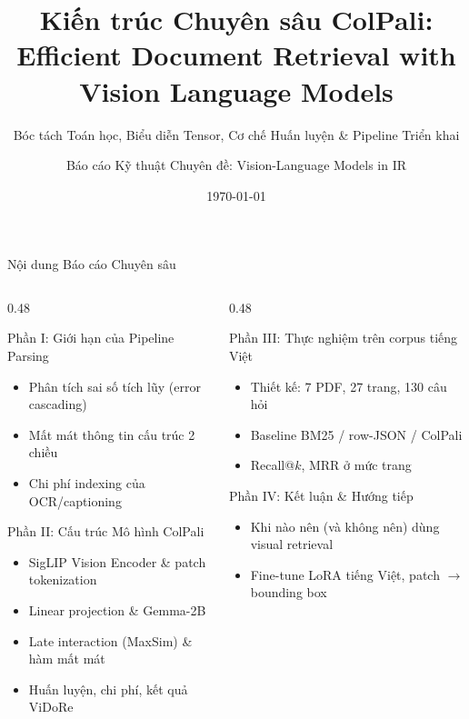 \documentclass[aspectratio=169,10pt]{beamer}
\title[Kiến trúc Chuyên sâu ColPali]{\textbf{Kiến trúc Chuyên sâu ColPali:\\ Efficient Document Retrieval with Vision Language Models}}
\subtitle{Bóc tách Toán học, Biểu diễn Tensor, Cơ chế Huấn luyện \& Pipeline Triển khai}
\author[Báo cáo Chuyên sâu AI]{Báo cáo Kỹ thuật Chuyên đề: Vision-Language Models in IR}
\institute[Advanced AI Lab]{Phòng Thí nghiệm Trí tuệ Nhân tạo \& Xử lý Ngôn ngữ Tự nhiên}
\date{\today}
\begin{document}
\begin{frame}
  \titlepage
\end{frame}

\begin{frame}{Nội dung Báo cáo Chuyên sâu}
  \begin{columns}[T]
    \begin{column}{0.48\textwidth}
      \begin{block}{Phần I: Giới hạn của Pipeline Parsing}
        \begin{itemize}
          \item Phân tích sai số tích lũy (error cascading)
          \item Mất mát thông tin cấu trúc 2 chiều
          \item Chi phí indexing của OCR/captioning
        \end{itemize}
      \end{block}
      \begin{block}{Phần II: Cấu trúc Mô hình ColPali}
        \begin{itemize}
          \item SigLIP Vision Encoder \& patch tokenization
          \item Linear projection \& Gemma-2B
          \item Late interaction (MaxSim) \& hàm mất mát
          \item Huấn luyện, chi phí, kết quả ViDoRe
        \end{itemize}
      \end{block}
    \end{column}
    \begin{column}{0.48\textwidth}
      \begin{block}{Phần III: Thực nghiệm trên corpus tiếng Việt}
        \begin{itemize}
          \item Thiết kế: 7 PDF, 27 trang, 130 câu hỏi
          \item Baseline BM25 / row-JSON / ColPali
          \item Recall@$k$, MRR ở mức trang
        \end{itemize}
      \end{block}
      \begin{block}{Phần IV: Kết luận \& Hướng tiếp}
        \begin{itemize}
          \item Khi nào nên (và không nên) dùng visual retrieval
          \item Fine-tune LoRA tiếng Việt, patch $\rightarrow$ bounding box
        \end{itemize}
      \end{block}
    \end{column}
  \end{columns}


\end{frame}
\end{document}
